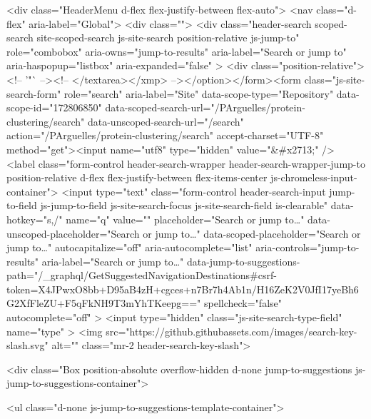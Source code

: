     <div class="HeaderMenu d-flex flex-justify-between flex-auto">
      <nav class="d-flex" aria-label="Global">
            <div class="">
              <div class="header-search scoped-search site-scoped-search js-site-search position-relative js-jump-to"
  role="combobox"
  aria-owns="jump-to-results"
  aria-label="Search or jump to"
  aria-haspopup="listbox"
  aria-expanded="false"
>
  <div class="position-relative">
    <!-- '"` --><!-- </textarea></xmp> --></option></form><form class="js-site-search-form" role="search" aria-label="Site" data-scope-type="Repository" data-scope-id="172806850" data-scoped-search-url="/PArguelles/protein-clustering/search" data-unscoped-search-url="/search" action="/PArguelles/protein-clustering/search" accept-charset="UTF-8" method="get"><input name="utf8" type="hidden" value="&#x2713;" />
      <label class="form-control header-search-wrapper header-search-wrapper-jump-to position-relative d-flex flex-justify-between flex-items-center js-chromeless-input-container">
        <input type="text"
          class="form-control header-search-input jump-to-field js-jump-to-field js-site-search-focus js-site-search-field is-clearable"
          data-hotkey="s,/"
          name="q"
          value=""
          placeholder="Search or jump to…"
          data-unscoped-placeholder="Search or jump to…"
          data-scoped-placeholder="Search or jump to…"
          autocapitalize="off"
          aria-autocomplete="list"
          aria-controls="jump-to-results"
          aria-label="Search or jump to…"
          data-jump-to-suggestions-path="/_graphql/GetSuggestedNavigationDestinations#csrf-token=X4JPwxO8bb+D95aB4zH+cgces+n7Br7h4Ab1n/H16ZeK2V0JfI17yeBh6G2XfFleZU+F5qFkNH9T3mYhTKeepg=="
          spellcheck="false"
          autocomplete="off"
          >
          <input type="hidden" class="js-site-search-type-field" name="type" >
            <img src="https://github.githubassets.com/images/search-key-slash.svg" alt="" class="mr-2 header-search-key-slash">

            <div class="Box position-absolute overflow-hidden d-none jump-to-suggestions js-jump-to-suggestions-container">
              
<ul class="d-none js-jump-to-suggestions-template-container">
  

